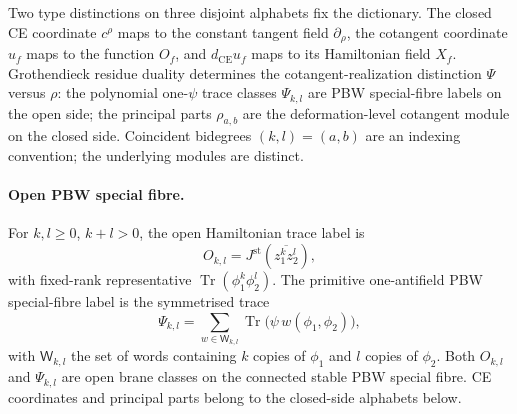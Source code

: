 \documentclass[11pt]{memoir}
\begin{document}
Two type distinctions on three disjoint alphabets fix the dictionary.
The closed CE coordinate \(c^\rho\) maps to the constant tangent field
\(\partial_\rho\), the cotangent coordinate \(u_f\) maps to the
function \(O_f\), and \(d_{\mathrm{CE}}u_f\) maps to its Hamiltonian
field \(X_f\).  Grothendieck residue duality determines the
cotangent-realization distinction \(\Psi\) versus \(\rho\): the
polynomial one-\(\psi\) trace classes \(\Psi_{k,l}\) are PBW
special-fibre labels on the open side; the principal parts
\(\rho_{a,b}\) are the deformation-level cotangent module on the
closed side.  Coincident bidegrees \((k,l)=(a,b)\) are an indexing
convention; the underlying modules are distinct.

\paragraph{Open PBW special fibre.}
For \(k,l\ge0\), \(k+l>0\), the open Hamiltonian trace label is
\[
  O_{k,l}=J^{\mathrm{st}}(\overline{z_1^kz_2^l}),
\]
with fixed-rank representative
\(\operatorname{Tr}(\phi_1^k\phi_2^l)\).
The primitive one-antifield PBW special-fibre label is the symmetrised
trace
\[
  \Psi_{k,l}
    =\sum_{w\in\mathsf W_{k,l}}
       \operatorname{Tr}\bigl(\psi\,w(\phi_1,\phi_2)\bigr),
\]
with \(\mathsf W_{k,l}\) the set of words containing \(k\) copies of
\(\phi_1\) and \(l\) copies of \(\phi_2\).  Both \(O_{k,l}\) and
\(\Psi_{k,l}\) are open brane classes on the connected stable PBW
special fibre.  CE coordinates and principal parts belong to the
closed-side alphabets below.
\end{document}
